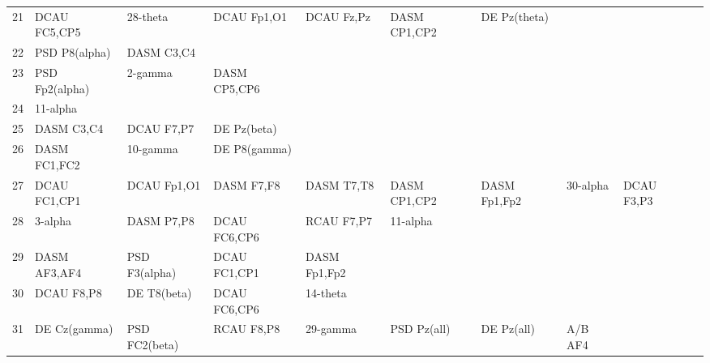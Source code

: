 \begin{landscape}
\begin{table}[]
\begin{tabular}{l|llllllll}
21       & DCAU FC5,CP5   & 28-theta       & DCAU Fp1,O1    & DCAU Fz,Pz     & DASM CP1,CP2   & DE Pz(theta)   &               &                &               &               \\
22       & PSD P8(alpha)  & DASM C3,C4     &                &                &                &                &               &                &               &               \\
23       & PSD Fp2(alpha) & 2-gamma        & DASM CP5,CP6   &                &                &                &               &                &               &               \\
24       & 11-alpha       &                &                &                &                &                &               &                &               &               \\
25       & DASM C3,C4     & DCAU F7,P7     & DE Pz(beta)    &                &                &                &               &                &               &               \\
26       & DASM FC1,FC2   & 10-gamma       & DE P8(gamma)   &                &                &                &               &                &               &               \\
27       & DCAU FC1,CP1   & DCAU Fp1,O1    & DASM F7,F8     & DASM T7,T8     & DASM CP1,CP2   & DASM Fp1,Fp2   & 30-alpha      & DCAU F3,P3     &               &               \\
28       & 3-alpha        & DASM P7,P8     & DCAU FC6,CP6   & RCAU F7,P7     & 11-alpha       &                &               &                &               &               \\
29       & DASM AF3,AF4   & PSD F3(alpha)  & DCAU FC1,CP1   & DASM Fp1,Fp2   &                &                &               &                &               &               \\
30       & DCAU F8,P8     & DE T8(beta)    & DCAU FC6,CP6   & 14-theta       &                &                &               &                &               &               \\
31       & DE Cz(gamma)   & PSD FC2(beta)  & RCAU F8,P8     & 29-gamma       & PSD Pz(all)    & DE Pz(all)     & A/B AF4       &                &               &               \\
\end{tabular}
\end{table}
\end{landscape}
\clearpage
